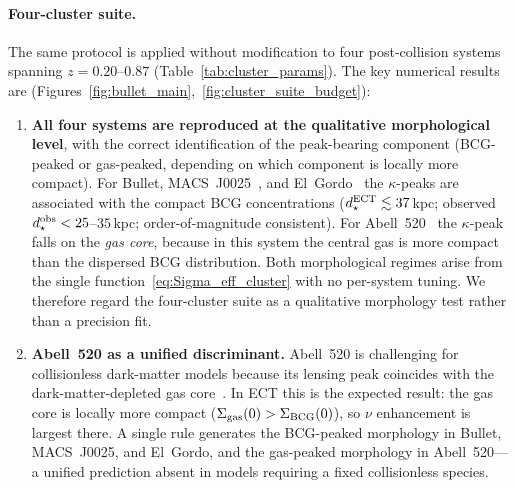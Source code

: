 \documentclass[11pt,a4paper]{article}
\numberwithin{equation}{section}
\begin{document}
\paragraph{Four-cluster suite.}
The same protocol is applied without modification to four
post-collision systems spanning $z=0.20$--$0.87$
(Table~\ref{tab:cluster_params}).
The key numerical results are
(Figures~\ref{fig:bullet_main},~\ref{fig:cluster_suite_budget}):
\begin{enumerate}[label=(\roman*)]
\item \textbf{All four systems are reproduced at the qualitative
  morphological level}, with the correct identification of the
  peak-bearing component (BCG-peaked or gas-peaked, depending on
  which component is locally more compact).
  For Bullet, MACS~J0025~\cite{Bradac2008}, and
  El~Gordo~\cite{Diego2023} the $\kappa$-peaks are associated with
  the compact BCG concentrations
  ($d_\star^{\rm ECT}\lesssim37\,$kpc;
  observed $d_\star^{\rm obs}<25$--$35\,$kpc; order-of-magnitude
  consistent).
  For Abell~520~\cite{Mahdavi2007,Jee2012} the $\kappa$-peak falls
  on the \emph{gas core}, because in this system the central gas is
  more compact than the dispersed BCG distribution.
  Both morphological regimes arise from the single
  function~\eqref{eq:Sigma_eff_cluster} with no per-system tuning.
  We therefore regard the four-cluster suite as a qualitative
  morphology test rather than a precision fit.

\item \textbf{Abell~520 as a unified discriminant.}
  Abell~520 is challenging for collisionless dark-matter models
  because its lensing peak coincides with the dark-matter-depleted
  gas core~\cite{Mahdavi2007}.
  In ECT this is the expected result: the gas core is locally more
  compact ($\Sigma_{\rm gas}(0)>\Sigma_{\rm BCG}(0)$), so $\nu$
  enhancement is largest there.
  A single rule generates the BCG-peaked morphology in Bullet,
  MACS~J0025, and El~Gordo, and the gas-peaked morphology in
  Abell~520---a unified prediction absent in models requiring a
  fixed collisionless species.


\end{enumerate}
\end{document}
